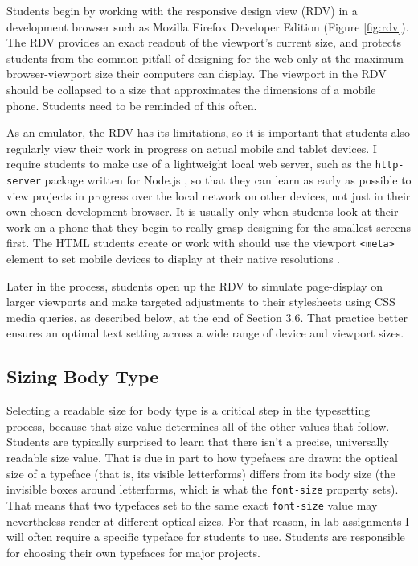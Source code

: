 \documentclass[sigplan,screen]{acmart}
\begin{document}
Students begin by working with the responsive design view (RDV) in a development browser such as Mozilla Firefox Developer Edition (Figure \ref{fig:rdv}). The RDV provides an exact readout of the viewport's current size, and protects students from the common pitfall of designing for the web only at the maximum browser-viewport size their computers can display. The viewport in the RDV should be collapsed to a size that approximates the dimensions of a mobile phone. Students need to be reminded of this often.

As an emulator, the RDV has its limitations, so it is important that students also regularly view their work in progress on actual mobile and tablet devices. I require students to make use of a lightweight local web server, such as the \verb|http-server| package written for Node.js \cite{npm:http}, so that they can learn as early as possible to view projects in progress over the local network on other devices, not just in their own chosen development browser. It is usually only when students look at their work on a phone that they begin to really grasp designing for the smallest screens first. The HTML students create or work with should use the viewport \verb|<meta>| element to set mobile devices to display at their native resolutions \cite{mdn:mvp}.

Later in the process, students open up the RDV to simulate page-display on larger viewports and make targeted adjustments to their stylesheets using CSS media queries, as described below, at the end of Section 3.6. That practice better ensures an optimal text setting across a wide range of device and viewport sizes.

\subsection{Sizing Body Type}

Selecting a readable size for body type is a critical step in the typesetting process, because that size value determines all of the other values that follow. Students are typically surprised to learn that there isn’t a precise, universally readable size value. That is due in part to how typefaces are drawn: the optical size of a typeface (that is, its visible letterforms) differs from its body size (the invisible boxes around letterforms, which is what the \verb|font-size| property sets). That means that two typefaces set to the same exact \verb|font-size| value may nevertheless render at different optical sizes. For that reason, in lab assignments I will often require a specific typeface for students to use. Students are responsible for choosing their own typefaces for major projects.
\end{document}
